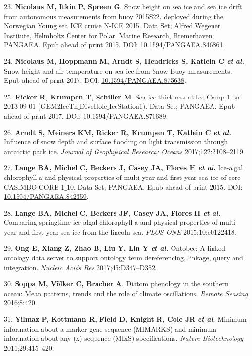 \documentclass[]{article}
\begin{document}
\leavevmode\hypertarget{ref-nicolaus2015shos}{}%
23. \textbf{Nicolaus M, Itkin P, Spreen G}. Snow height on sea ice and
sea ice drift from autonomous measurements from buoy 2015S22, deployed
during the Norwegian Young sea ICE cruise N-ICE 2015. Data Set; Alfred
Wegener Institute, Helmholtz Center for Polar; Marine Research,
Bremerhaven; PANGAEA. Epub ahead of print 2015. DOI:
\href{https://doi.org/10.1594/PANGAEA.846861}{10.1594/PANGAEA.846861}.

\leavevmode\hypertarget{ref-nicolaus2017shaa}{}%
24. \textbf{Nicolaus M, Hoppmann M, Arndt S, Hendricks S, Katlein C
\emph{et al.}} Snow height and air temperature on sea ice from Snow Buoy
measurements. Epub ahead of print 2017. DOI:
\href{https://doi.org/10.1594/PANGAEA.875638}{10.1594/PANGAEA.875638}.

\leavevmode\hypertarget{ref-ricker2017sita}{}%
25. \textbf{Ricker R, Krumpen T, Schiller M}. Sea ice thickness at Ice
Camp 1 on 2013-09-01 (GEM2IceTh\(\_\)DiveHole\(\_\)IceStation1). Data
Set; PANGAEA. Epub ahead of print 2017. DOI:
\href{https://doi.org/10.1594/PANGAEA.870689}{10.1594/PANGAEA.870689}.

\leavevmode\hypertarget{ref-Arndt_2017}{}%
26. \textbf{Arndt S, Meiners KM, Ricker R, Krumpen T, Katlein C \emph{et
al.}} Influence of snow depth and surface flooding on light transmission
through antarctic pack ice. \emph{Journal of Geophysical Research:
Oceans} 2017;122:2108--2119.

\leavevmode\hypertarget{ref-lange2015icaa}{}%
27. \textbf{Lange BA, Michel C, Beckers J, Casey JA, Flores H \emph{et
al.}} Ice-algal chlorophyll a and physical properties of multi-year and
first-year sea ice of core CASIMBO-CORE-1\(\_\)10. Data Set; PANGAEA.
Epub ahead of print 2015. DOI:
\href{https://doi.org/10.1594/PANGAEA.842359}{10.1594/PANGAEA.842359}.

\leavevmode\hypertarget{ref-Lange_2015}{}%
28. \textbf{Lange BA, Michel C, Beckers JF, Casey JA, Flores H \emph{et
al.}} Comparing springtime ice-algal chlorophyll a and physical
properties of multi-year and first-year sea ice from the lincoln sea.
\emph{PLOS ONE} 2015;10:e0122418.

\leavevmode\hypertarget{ref-Ong2017}{}%
29. \textbf{Ong E, Xiang Z, Zhao B, Liu Y, Lin Y \emph{et al.}} Ontobee:
A linked ontology data server to support ontology term dereferencing,
linkage, query and integration. \emph{Nucleic Acids Res}
2017;45:D347--D352.

\leavevmode\hypertarget{ref-Soppa_2016}{}%
30. \textbf{Soppa M, Völker C, Bracher A}. Diatom phenology in the
southern ocean: Mean patterns, trends and the role of climate
oscillations. \emph{Remote Sensing} 2016;8:420.

\leavevmode\hypertarget{ref-Yilmaz_2011}{}%
31. \textbf{Yilmaz P, Kottmann R, Field D, Knight R, Cole JR \emph{et
al.}} Minimum information about a marker gene sequence (MIMARKS) and
minimum information about any (x) sequence (MIxS) specifications.
\emph{Nature Biotechnology} 2011;29:415--420.
\end{document}
